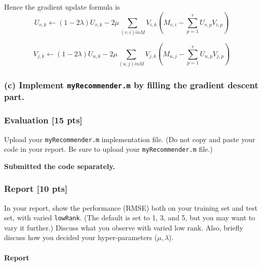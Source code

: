 \documentclass[twoside,10pt]{article}
\begin{document}
Hence the gradient update formula is \\

$$ \boxed{U_{v,k} \gets (1-2 \lambda)U_{v,k} - 2\mu \sum_{(v,i) in M} {V_{i,k} (M_{v,i} - \sum_{p=1}^r U_{v,p} V_{i,p})}  }$$

$$ \boxed{V_{j,k} \gets (1-2 \lambda) U_{u,k} - 2\mu \sum_{(u,j) in M} {V_{j,k} (M_{u,j} - \sum_{p=1}^r U_{u,p} V_{j,p})} }$$



\subsubsection*{(c) Implement \texttt{myRecommender.m} by filling the gradient descent part.}


\subsubsection*{Evaluation [15 pts]}
Upload your \texttt{myRecommender.m} implementation file. (Do not
copy and paste your code in your report. Be sure to upload your
\texttt{myRecommender.m} file.)

\textbf{Submitted the code separately. }

\subsubsection*{Report [10 pts]}
In your report, show the performance (RMSE) both on your training
set and test set, with varied \texttt{lowRank}. (The default is set
to 1, 3, and 5, but you may want to vary it further.) Discuss what
you observe with varied low rank. Also, briefly discuss how you
decided your hyper-parameters ($\mu, \lambda$).\\\\

\textbf{Report}
\end{document}
